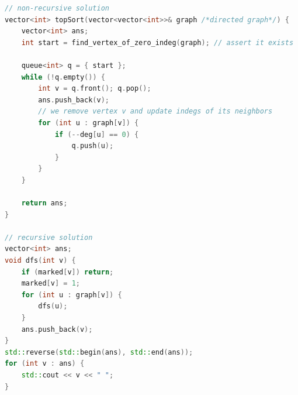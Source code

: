 \begin{lstlisting}[language=C++]
// non-recursive solution
vector<int> topSort(vector<vector<int>>& graph /*directed graph*/) {
    vector<int> ans;
    int start = find_vertex_of_zero_indeg(graph); // assert it exists

    queue<int> q = { start };
    while (!q.empty()) {
        int v = q.front(); q.pop();
        ans.push_back(v);
        // we remove vertex v and update indegs of its neighbors
        for (int u : graph[v]) {
            if (--deg[u] == 0) {
                q.push(u);
            }
        }
    }

    return ans;
}

// recursive solution
vector<int> ans;
void dfs(int v) {
    if (marked[v]) return;
    marked[v] = 1;
    for (int u : graph[v]) {
        dfs(u);
    }
    ans.push_back(v);
}
std::reverse(std::begin(ans), std::end(ans));
for (int v : ans) {
    std::cout << v << " ";
}
\end{lstlisting}
